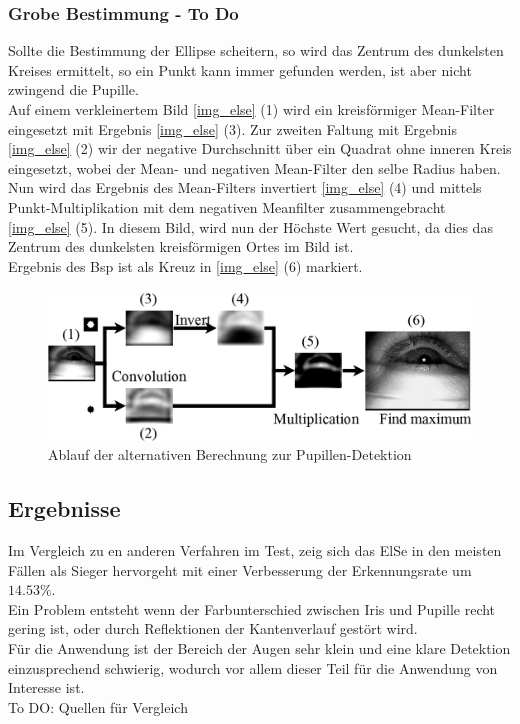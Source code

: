 \subsubsection{Grobe Bestimmung - To Do}
Sollte die Bestimmung der Ellipse scheitern, so wird das Zentrum des dunkelsten Kreises ermittelt, so ein Punkt kann immer gefunden werden, ist aber nicht zwingend die Pupille.\\
Auf einem verkleinertem Bild \autoref{img_else} (1) wird ein kreisförmiger Mean-Filter eingesetzt mit Ergebnis \autoref{img_else} (3). Zur zweiten Faltung mit Ergebnis \autoref{img_else} (2) wir der negative Durchschnitt über ein Quadrat ohne inneren Kreis eingesetzt, wobei der Mean- und negativen Mean-Filter den selbe Radius haben.\\
Nun wird das Ergebnis des Mean-Filters invertiert \autoref{img_else} (4) und mittels Punkt-Multiplikation mit dem negativen Meanfilter zusammengebracht \autoref{img_else} (5). In diesem Bild, wird nun der Höchste Wert gesucht, da dies das Zentrum des dunkelsten kreisförmigen Ortes im Bild ist.\\
Ergebnis des Bsp ist als Kreuz in \autoref{img_else} (6) markiert. 
\begin{figure}
	\centering
	\includegraphics[width=0.8\linewidth]{img/ElSe}
	\caption{Ablauf der alternativen Berechnung zur Pupillen-Detektion}
	\label{img_else}
\end{figure}
\subsection{Ergebnisse}
Im Vergleich zu en anderen Verfahren im Test, zeig sich das ElSe in den meisten Fällen als Sieger hervorgeht mit einer Verbesserung der Erkennungsrate um $14.53\%$.\\
Ein Problem entsteht wenn der Farbunterschied zwischen Iris und Pupille recht gering ist, oder durch Reflektionen der Kantenverlauf gestört wird.\\
Für die Anwendung ist der Bereich der Augen sehr klein und eine klare Detektion einzusprechend schwierig, wodurch vor allem dieser Teil für die Anwendung von Interesse ist.\\
To DO: Quellen für Vergleich